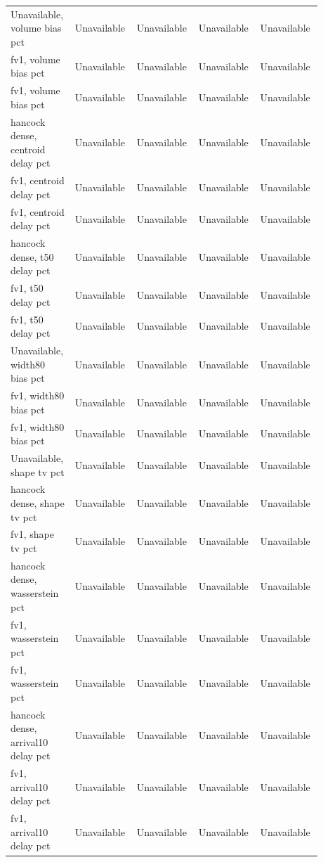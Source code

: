 \begin{longtable}{p{0.1760\linewidth}p{0.1760\linewidth}p{0.1760\linewidth}p{0.1760\linewidth}p{0.1760\linewidth}}
Unavailable, volume bias pct & Unavailable & Unavailable & Unavailable & Unavailable \\
fv1, volume bias pct & Unavailable & Unavailable & Unavailable & Unavailable \\
fv1, volume bias pct & Unavailable & Unavailable & Unavailable & Unavailable \\
hancock dense, centroid delay pct & Unavailable & Unavailable & Unavailable & Unavailable \\
fv1, centroid delay pct & Unavailable & Unavailable & Unavailable & Unavailable \\
fv1, centroid delay pct & Unavailable & Unavailable & Unavailable & Unavailable \\
hancock dense, t50 delay pct & Unavailable & Unavailable & Unavailable & Unavailable \\
fv1, t50 delay pct & Unavailable & Unavailable & Unavailable & Unavailable \\
fv1, t50 delay pct & Unavailable & Unavailable & Unavailable & Unavailable \\
Unavailable, width80 bias pct & Unavailable & Unavailable & Unavailable & Unavailable \\
fv1, width80 bias pct & Unavailable & Unavailable & Unavailable & Unavailable \\
fv1, width80 bias pct & Unavailable & Unavailable & Unavailable & Unavailable \\
Unavailable, shape tv pct & Unavailable & Unavailable & Unavailable & Unavailable \\
hancock dense, shape tv pct & Unavailable & Unavailable & Unavailable & Unavailable \\
fv1, shape tv pct & Unavailable & Unavailable & Unavailable & Unavailable \\
hancock dense, wasserstein pct & Unavailable & Unavailable & Unavailable & Unavailable \\
fv1, wasserstein pct & Unavailable & Unavailable & Unavailable & Unavailable \\
fv1, wasserstein pct & Unavailable & Unavailable & Unavailable & Unavailable \\
hancock dense, arrival10 delay pct & Unavailable & Unavailable & Unavailable & Unavailable \\
fv1, arrival10 delay pct & Unavailable & Unavailable & Unavailable & Unavailable \\
fv1, arrival10 delay pct & Unavailable & Unavailable & Unavailable & Unavailable \\

\end{longtable}
